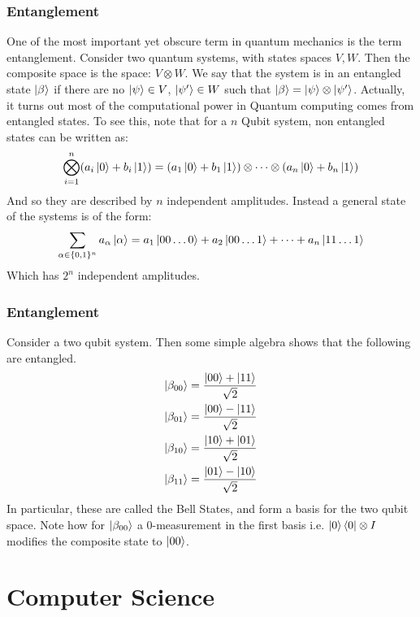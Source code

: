 \documentclass{beamer}
\begin{document}
\begin{frame}
    \frametitle{Entanglement}
    One of the most important yet obscure term in quantum mechanics is the term entanglement.
    Consider two quantum systems, with states spaces $V, W$. Then the composite space is the space: $V \otimes W$.
    We say that the system is in an entangled state $\ket{\beta}$ if there are no $\ket{\psi} \in V$, $\ket{\psi'} \in W$
    such that $\ket{\beta} = \ket{\psi} \otimes \ket{\psi'}$.
    Actually, it turns out most of the computational power in Quantum computing comes from entangled states.
    To see this, note that for a $n$ Qubit system, non entangled states can be written as:
    \begin{equation}
        \bigotimes_{i =1}^n (a_i \ket{0} + b_i \ket{1}) = (a_1 \ket{0} + b_1 \ket{1}) \otimes \dots \otimes (a_n \ket{0} + b_n \ket{1})
    \end{equation}
    And so they are described by $n$ independent amplitudes. Instead a general state of the systems is of the form:
    \begin{equation}
        \sum_{\alpha \in \{0,1\}^n} a_\alpha \ket{\alpha} =  a_1 \ket{00\dots0} + a_2 \ket{00\dots1} + \dots + a_n \ket{11\dots1}
    \end{equation}
    Which has $2^n$ independent amplitudes.
\end{frame}
\begin{frame}
    \frametitle{Entanglement}
    \begin{example}
        Consider a two qubit system. Then some simple algebra shows that the following are entangled.
        \begin{align}
            \label{Bell states}
            \ket{\beta_{00}} & = \frac{\ket{00} + \ket{11}}{\sqrt{2}} \\
            \ket{\beta_{01}} & = \frac{\ket{00} - \ket{11}}{\sqrt{2}} \\
            \ket{\beta_{10}} & = \frac{\ket{10} + \ket{01}}{\sqrt{2}} \\
            \ket{\beta_{11}} & = \frac{\ket{01} - \ket{10}}{\sqrt{2}}
        \end{align}
        In particular, these are called the Bell States, and form a basis for the two qubit space.
        Note how for $\ket{\beta_{00}}$ a 0-measurement in the first basis i.e. $\ket{0}\bra{0} \otimes I$
        modifies the composite state to $\ket{00}$.
    \end{example}
\end{frame}
\section{Computer Science}
\end{document}
